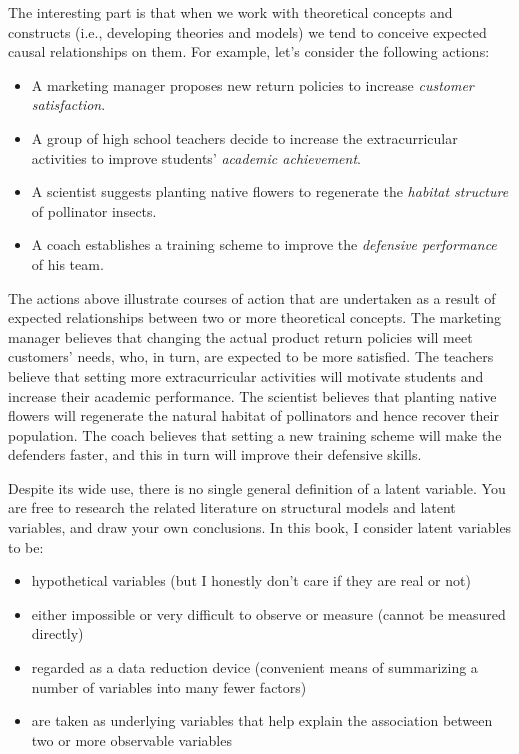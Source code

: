 \documentclass[12pt]{book}\usepackage{graphicx, color}
\begin{document}
The interesting part is that when we work with theoretical concepts and constructs (i.e., developing theories and models) we tend to conceive expected causal relationships on them. For example, let's consider the following actions:
\begin{itemize}
 \item A marketing manager proposes new return policies to increase \textit{customer satisfaction}.
 \item A group of high school teachers decide to increase the extracurricular activities to improve students' \textit{academic achievement}.
 \item A scientist suggests planting native flowers to regenerate the \textit{habitat structure} of pollinator insects.
 \item A coach establishes a training scheme to improve the \textit{defensive performance} of his team.
\end{itemize}

\vspace{2mm}
The actions above illustrate courses of action that are undertaken as a result of expected relationships between two or more theoretical concepts. The marketing manager believes that changing the actual product return policies will meet customers' needs, who, in turn, are expected to be more satisfied. The teachers believe that setting more extracurricular activities will motivate students and increase their academic performance. The scientist believes that planting native flowers will regenerate the natural habitat of pollinators and hence recover their population. The coach believes that setting a new training scheme will make the defenders faster, and this in turn will improve their defensive skills. 

Despite its wide use, there is no single general definition of a latent variable. You are free to research the related literature on structural models and latent variables, and draw your own conclusions. In this book, I consider latent variables to be:
\begin{itemize}
 \item hypothetical variables (but I honestly don't care if they are real or not)
 \item either impossible or very difficult to observe or measure (cannot be measured directly)
 \item regarded as a data reduction device (convenient means of summarizing a number of variables into many fewer factors)
 \item are taken as underlying variables that help explain the association between two or more observable variables
\end{itemize}
\end{document}
